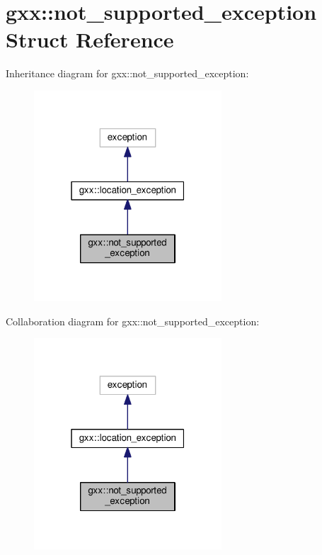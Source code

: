 \hypertarget{structgxx_1_1not__supported__exception}{}\section{gxx\+:\+:not\+\_\+supported\+\_\+exception Struct Reference}
\label{structgxx_1_1not__supported__exception}


Inheritance diagram for gxx\+:\+:not\+\_\+supported\+\_\+exception\+:
\nopagebreak
\begin{figure}[H]
\begin{center}
\leavevmode
\includegraphics[width=199pt]{structgxx_1_1not__supported__exception__inherit__graph}
\end{center}
\end{figure}


Collaboration diagram for gxx\+:\+:not\+\_\+supported\+\_\+exception\+:
\nopagebreak
\begin{figure}[H]
\begin{center}
\leavevmode
\includegraphics[width=199pt]{structgxx_1_1not__supported__exception__coll__graph}
\end{center}
\end{figure}
